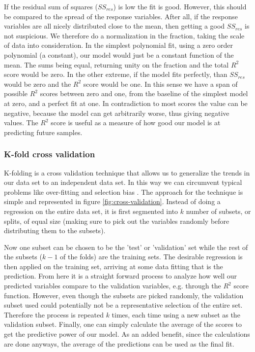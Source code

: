 	If the residual sum of squares ($SS_{res}$) is low the fit is good. However, this should be compared to the spread of the response variables. After all, if the response variables are all nicely distributed close to the mean, then getting a good $SS_{res}$ is not suspicious. We therefore do a normalization in the fraction, taking the scale of data into consideration. In the simplest polynomial fit, using a zero order polynomial (a constant), our model would just be a constant function of the mean. The sums being equal, returning unity on the fraction and the total $R^2$ score would be zero. In the other extreme, if the model fits perfectly, than $SS_{res}$ would be zero and the $R^2$ score would be one. In this sense we have a span of possible $R^2$ scores between zero and one, from the baseline of the simplest model at zero, and a perfect fit at one. In contradiction to most scores the value can be negative, because the model can get arbitrarily worse, thus giving negative values.
	The $R^2$ score is useful as a measure of how good our model is at predicting future samples.
	
\subsubsection{K-fold cross validation}\label{sec:cross_validation}
	K-folding is a cross validation technique that allows us to generalize the trends in our data set to an independent data set. In this way we can circumvent typical problems like over-fitting and selection bias \cite{james2013introduction}. The approach for the technique is simple and represented in figure \ref{fig:cross-validation}. Instead of doing a regression on the entire data set, it is first segmented into $k$ number of subsets, or splits, of equal size (making sure to pick out the variables randomly before distributing them to the subsets).
	
	Now one subset can be chosen to be the 'test' or 'validation' set while the rest of the subsets ($k-1$ of the folds) are the training sets. The desirable regression is then applied on the training set, arriving at some data fitting that is the prediction. From here it is a straight forward process to analyze how well our predicted variables compare to the validation variables, e.g. through the $R^2$ score function. However, even though the subsets are picked randomly, the validation subset used could potentially not be a representative selection of the entire set. Therefore the process is repeated $k$ times, each time using a new subset as the validation subset. Finally, one can simply calculate the average of the scores to get the predictive power of our model. As an added benefit, since the calculations are done anyways, the average of the predictions can be used as the final fit.
	

